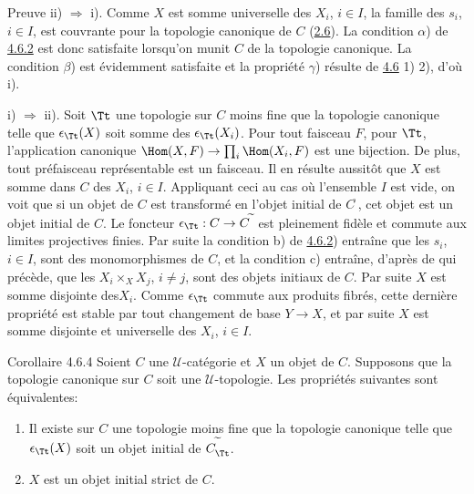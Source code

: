 \begin{enonce*}[remark]{Preuve}
ii) $\Rightarrow$ i). Comme $X$ est somme universelle des $X_i$,
$i\in I$, la famille des $s_i$, $i\in I$, est couvrante pour la
topologie canonique de $C$ (\hyperref[II.prop2.6]{2.6}). La condition
$\alpha$) de \hyperref[II.cor4.6.2]{4.6.2} est donc satisfaite lorsqu'on munit
$C$ de la topologie canonique. La condition $\beta$) est
évidemment satisfaite et la propriété $\gamma$) résulte de
\hyperref[II.prop4.6]{4.6} 1) 2), d'où i).

\noindent i) $\Rightarrow$ ii). Soit $\Tt$ une topologie sur $C$
moins fine que la topologie canonique telle que $\epsilon_{\Tt}(X)$
soit somme des $\epsilon_{\Tt}(X_i)$. Pour tout faisceau $F$, pour
$\Tt$, l'application canonique $\Hom(X,F)\rightarrow
\prod_i\Hom(X_i,F)$ est une bijection. De plus, tout préfaisceau
représentable est un faisceau. Il en résulte aussitôt que $X$ est
somme dans $C$ des $X_i$, $i\in I$. Appliquant ceci au cas où
l'ensemble $I$ est vide, on voit que si un objet de $C$ est
transformé en l'objet initial de $C^{\widetilde{\phantom{,}}}$, cet
objet est un objet initial de $C$. Le foncteur
$\epsilon_{\Tt}:C\rightarrow C^{\widetilde{\phantom{,}}}$ est
pleinement fidèle et commute aux limites projectives finies. Par
suite la condition b) de \hyperref[II.cor4.6.2]{4.6.2}) entraîne que les $s_i$,
$i\in I$, sont des monomorphismes de $C$, et la condition c)
entraîne, d'après de qui précède, que les $X_i\times_X X_j$, $i\neq
j$, sont des objets initiaux de $C$. Par suite $X$ est somme
disjointe des\pageoriginale $X_i$. Comme $\epsilon_{\Tt}$ commute
aux produits fibrés, cette dernière propriété est stable par tout
changement de base $Y\rightarrow X$, et par suite $X$ est somme
disjointe et universelle des $X_i$, $i\in I$.
\end{enonce*}

\begin{enonce*}{Corollaire 4.6.4}
Soient $C$ une $𝒰$-catégorie et $X$ un objet de $C$.
Supposons que la topologie canonique sur $C$ soit une
$𝒰$-topologie. Les propriétés suivantes sont
équivalentes:
\begin{enumerate}
\renewcommand{\theenumi}{\roman{enumi}}
\renewcommand{\labelenumi}{\theenumi)}
\item Il existe sur $C$ une topologie moins fine que la topologie
  canonique telle que $\epsilon_{\Tt}(X)$ soit un objet
  initial de $C^{\widetilde{\phantom{,}}}_{\Tt}$.

\item $X$ est un objet initial strict de $C$.
\end{enumerate}
\end{enonce*}

